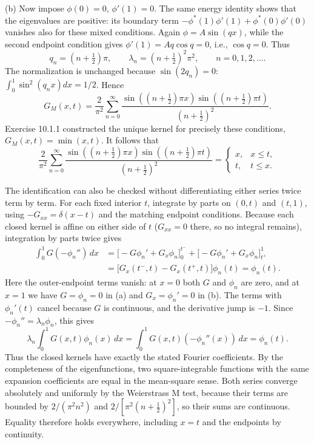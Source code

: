 (b) Now impose $\phi(0)=0$, $\phi'(1)=0$. The same energy identity
shows that the eigenvalues are positive: its boundary term
$-\phi^*(1)\phi'(1)+\phi^*(0)\phi'(0)$ vanishes also for these mixed
conditions. Again $\phi=A\sin(qx)$, while the second endpoint
condition gives $\phi'(1)=Aq\cos q=0$, i.e., $\cos q=0$. Thus
\[
q_n=(n+\tfrac12)\pi,\qquad
\lambda_n=(n+\tfrac12)^2\pi^2,\qquad n=0,1,2,\ldots.
\]
The normalization is unchanged because $\sin(2q_n)=0$:
$\int_0^1\sin^2(q_nx)dx=1/2$. Hence
\[
G_M(x,t)=\frac2{\pi^2}\sum_{n=0}^\infty
\frac{\sin((n+\tfrac12)\pi x)\sin((n+\tfrac12)\pi t)}{(n+\tfrac12)^2}.
\]
Exercise 10.1.1 constructed the unique kernel for precisely these
conditions, $G_M(x,t)=\min(x,t)$. It follows that
\[
\boxed{\frac2{\pi^2}\sum_{n=0}^\infty
\frac{\sin((n+\tfrac12)\pi x)\sin((n+\tfrac12)\pi t)}{(n+\tfrac12)^2}
=\begin{cases}x,&x\le t,\\t,&t\le x.\end{cases}}
\]

The identification can also be checked without differentiating either
series twice term by term. For each fixed interior $t$, integrate
by parts on $(0,t)$ and $(t,1)$, using $-G_{xx}=\delta(x-t)$ and
the matching endpoint conditions.  Because each closed kernel is affine
on either side of $t$ ($G_{xx}=0$ there, so no integral remains),
integration by parts twice gives
\begin{align*}
\int_0^1G(-\phi_n'')\,dx
&=\bigl[-G\phi_n'+G_x\phi_n\bigr]_{0}^{t^-}
 +\bigl[-G\phi_n'+G_x\phi_n\bigr]_{t^+}^{1}\\
&=\bigl[G_x(t^-,t)-G_x(t^+,t)\bigr]\phi_n(t)=\phi_n(t).
\end{align*}
Here the outer-endpoint terms vanish: at $x=0$ both $G$ and $\phi_n$
are zero, and at $x=1$ we have $G=\phi_n=0$ in (a) and
$G_x=\phi_n'=0$ in (b). The terms with $\phi_n'(t)$ cancel because
$G$ is continuous, and the derivative jump is $-1$.
Since $-\phi_n''=\lambda_n\phi_n$, this gives
\[
\lambda_n\int_0^1G(x,t)\phi_n(x)\,dx
=\int_0^1G(x,t)(-\phi_n''(x))\,dx=\phi_n(t).
\]
Thus the closed kernels have exactly the stated Fourier coefficients.
By the completeness of the eigenfunctions, two square-integrable
functions with the same expansion coefficients are equal in the
mean-square sense. Both series converge absolutely and uniformly by the
Weierstrass M test, because their terms are bounded by $2/(\pi^2n^2)$
and $2/[\pi^2(n+\frac12)^2]$, so their sums are continuous. Equality
therefore holds everywhere, including $x=t$ and the endpoints by
continuity.

